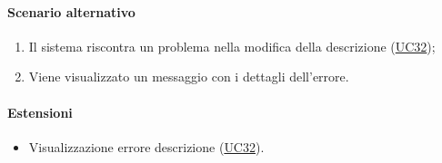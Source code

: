 \paragraph*{Scenario alternativo}
\begin{enumerate}
  \item Il sistema riscontra un problema nella modifica della descrizione (\hyperref[UC32]{UC32});
  \item Viene visualizzato un messaggio con i dettagli dell'errore.
\end{enumerate}

\paragraph*{Estensioni}
\begin{itemize}
  \item Visualizzazione errore descrizione  (\hyperref[UC32]{UC32}).
\end{itemize}